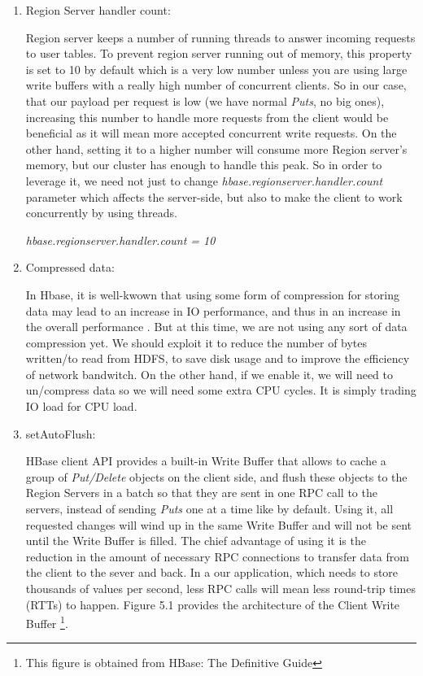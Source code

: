 \begin{enumerate}
\item{Region Server handler count:}
\par
Region server keeps a number of running threads to answer incoming requests to user tables. To prevent region server running out of memory, this property is set to 10 by default which is a very low number unless you are using large write buffers with a really high number of concurrent clients. So in our case, that our payload per request is low (we have normal \textit{Puts}, no big ones), increasing this number to handle more requests from the client would be beneficial as it will mean more accepted concurrent write requests. On the other hand, setting it to a higher number will consume more Region server's memory, but our cluster has enough to handle this peak. So in order to leverage it, we need not just to change \textit{hbase.regionserver.handler.count} parameter which affects the server-side, but also to make the client to work concurrently by using threads.

\bigskip

\centerline{\textit{hbase.regionserver.handler.count = 10}}
\bigskip
\item Compressed data:
\par
In Hbase, it is well-kwown that using some form of compression for storing data may lead to an increase in IO performance, and thus in an increase in the overall performance \cite{raichand2013short} \cite{cheng2013key} \cite{aiyer2012storage} \cite{ApacheHBaseCompression}. But at this time, we are not using any sort of data compression yet. We should exploit it to reduce the number of bytes written/to read from HDFS, to save disk usage and to improve the efficiency of network bandwitch. On the other hand, if we enable it, we will need to un/compress data so we will need some extra CPU cycles. It is simply trading IO load for CPU load.

 \bigskip

\item setAutoFlush:
\par
HBase client API provides a built-in Write Buffer that allows to cache a group of \textit{Put/Delete} objects on the client side, and flush these objects to the Region Servers in a batch so that they are sent in one RPC call to the servers, instead of sending \textit{Puts} one at a time like by default. Using it, all requested changes will wind up in the same Write Buffer and will not be sent until the Write Buffer is filled. The chief advantage of using it is the reduction in the amount of necessary RPC connections to transfer data from the client to the sever and back. In a our application, which needs to store thousands of values per second, less RPC calls will mean less round-trip times (RTTs) to happen. Figure 5.1 provides the architecture of the Client Write Buffer \footnote{This figure is obtained from HBase: The Definitive Guide}.


\end{enumerate}

